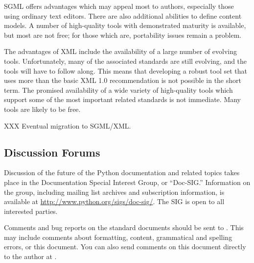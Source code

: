 \documentclass{howto}
\begin{document}
    SGML offers advantages which may appeal most to authors,
    especially those using ordinary text editors.  There are also
    additional abilities to define content models.  A number of
    high-quality tools with demonstrated maturity is available, but
    most are not free; for those which are, portability issues remain
    a problem.

    The advantages of XML include the availability of a large number
    of evolving tools.  Unfortunately, many of the associated
    standards are still evolving, and the tools will have to follow
    along.  This means that developing a robust tool set that uses
    more than the basic XML 1.0 recommendation is not possible in the
    short term.  The promised availability of a wide variety of
    high-quality tools which support some of the most important
    related standards is not immediate.  Many tools are likely to be
    free.

    XXX Eventual migration to SGML/XML.

  \subsection{Discussion Forums \label{discussion}}

    Discussion of the future of the Python documentation and related
    topics takes place in the Documentation Special Interest Group, or
    ``Doc-SIG.''  Information on the group, including mailing list
    archives and subscription information, is available at
    \url{http://www.python.org/sigs/doc-sig/}.  The SIG is open to all
    interested parties.

    Comments and bug reports on the standard documents should be sent
    to .  This may include comments
    about formatting, content, grammatical and spelling errors, or
    this document.  You can also send comments on this document
    directly to the author at .
\end{document}

